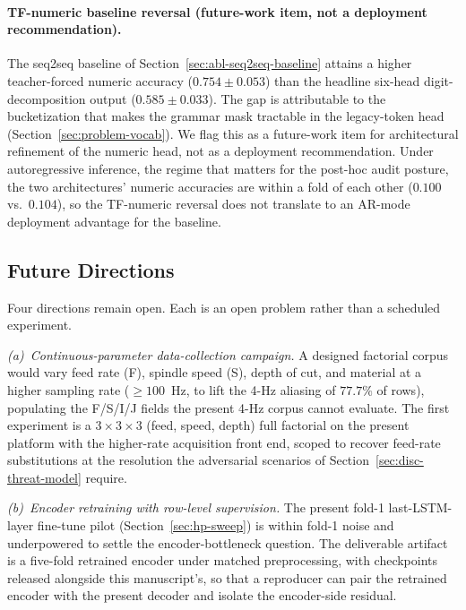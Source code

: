 \documentclass[sensors,article,submit,moreauthors,pdftex]{Definitions/mdpi}
\begin{document}
\paragraph{TF-numeric baseline reversal (future-work item, not a deployment recommendation).} The seq2seq baseline of Section~\ref{sec:abl-seq2seq-baseline} attains a higher teacher-forced numeric accuracy ($0.754 \pm 0.053$) than the headline six-head digit-decomposition output ($0.585 \pm 0.033$). The gap is attributable to the bucketization that makes the grammar mask tractable in the legacy-token head (Section~\ref{sec:problem-vocab}). We flag this as a future-work item for architectural refinement of the numeric head, not as a deployment recommendation. Under autoregressive inference, the regime that matters for the post-hoc audit posture, the two architectures' numeric accuracies are within a fold of each other ($0.100$ vs.\ $0.104$), so the TF-numeric reversal does not translate to an AR-mode deployment advantage for the baseline.

\subsection{Future Directions}
\label{sec:roadmap}

Four directions remain open. Each is an open problem rather than a scheduled experiment.

\emph{(a)~Continuous-parameter data-collection campaign.} A designed factorial corpus would vary feed rate (F), spindle speed (S), depth of cut, and material at a higher sampling rate ($\geq\!100$~Hz, to lift the 4-Hz aliasing of $77.7\%$ of rows), populating the F/S/I/J fields the present 4-Hz corpus cannot evaluate. The first experiment is a $3\!\times\!3\!\times\!3$ (feed, speed, depth) full factorial on the present platform with the higher-rate acquisition front end, scoped to recover feed-rate substitutions at the resolution the adversarial scenarios of Section~\ref{sec:disc-threat-model} require.

\emph{(b)~Encoder retraining with row-level supervision.} The present fold-1 last-LSTM-layer fine-tune pilot (Section~\ref{sec:hp-sweep}) is within fold-1 noise and underpowered to settle the encoder-bottleneck question. The deliverable artifact is a five-fold retrained encoder under matched preprocessing, with checkpoints released alongside this manuscript's, so that a reproducer can pair the retrained encoder with the present decoder and isolate the encoder-side residual.
\end{document}
